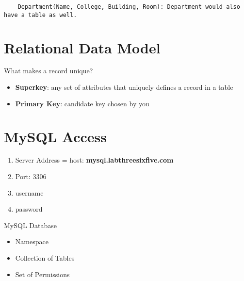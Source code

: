 \documentclass[twoside]{article}
\begin{document}
\begin{verbatim}
    Department(Name, College, Building, Room): Department would also have a table as well.
\end{verbatim}

\newpage
\hfill \break 
{}

\section*{Relational Data Model}

What makes a record unique?
\begin{itemize}
    \item \textbf{Superkey}: any set of attributes that uniquely defines a 
    record in a table
    \item \textbf{Primary Key}: candidate key chosen by you
\end{itemize}

\newpage
\hfill \break 
{}

\section*{MySQL Access}
\begin{enumerate}
    \item Server Address = host: \textbf{mysql.labthreesixfive.com}
    \item Port: 3306
    \item username
    \item password
\end{enumerate}

MySQL Database
\begin{itemize}
    \item Namespace
    \item Collection of Tables
    \item Set of Permissions
\end{itemize}
\end{document}
